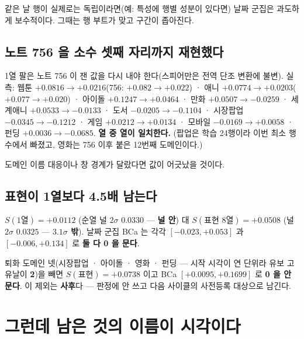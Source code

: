 \documentclass[10pt]{article}
\begin{document}
{같은 날 행이 실제로는 독립이라면(예: 특성에 행별 성분이 있다면) 날짜 군집은
과도하게 보수적이다. 그때는 행 부트가 맞고 구간이 좁아진다.}

\subsection{노트 756 을 소수 셋째 자리까지 재현했다}

1열 팔은 노트 756 이 잰 값을 다시 내야 한다(스피어만은 전역 단조 변환에 불변).
실측: 웹툰 $+0.0816\to+0.0216$(756: $+0.082\to+0.022$) · 애니
$+0.0774\to+0.0203$($+0.077\to+0.020$) · 아이돌 $+0.1247\to+0.0464$ · 만화
$+0.0507\to-0.0259$ · 세계애니 $+0.0533\to-0.0133$ · 도서 $-0.0205\to-0.1104$ ·
시장팝업 $-0.0345\to-0.1212$ · 게임 $+0.0212\to+0.0134$ · 모바일
$-0.0169\to+0.0058$ · 펀딩 $+0.0036\to-0.0685$. \textbf{열 중 열이 일치한다.}
(팝업은 학습 24행이라 이번 최소 행수에서 빠졌고, 영화는 756 이후 붙은 12번째
도메인이다.)

{도메인 이름 대응이나 창 경계가 달랐다면 값이 어긋났을 것이다.}

\subsection{표현이 1열보다 4.5배 남는다}

$S(\text{1열}) = +0.0112$ (순열 널 $2\sigma$ $0.0330$ --- \textbf{널 안}) 대
$S(\text{표현 8열}) = \mathbf{+0.0508}$ (널 $2\sigma$ $0.0325$ --- \textbf{$3.1\sigma$
밖}). 날짜 군집 BCa 는 각각 $[-0.023,+0.053]$ 과 $[-0.006,+0.134]$ 로 \textbf{둘 다 0 을
문다}.

퇴화 도메인 넷(시장팝업 · 아이돌 · 영화 · 펀딩 --- 시작 시각이 연 단위라 유보
고유날이 \textbf{2})을 빼면 $S(\text{표현}) = \mathbf{+0.0738}$ 이고 BCa
$[+0.0095,+0.1699]$ 로 \textbf{0 을 안 문다}. 이 제외는 \textbf{사후}다 ---
판정에 안 쓰고 다음 사이클의 사전등록 대상으로 남긴다.

\section{그런데 남은 것의 이름이 시각이다}
\end{document}
